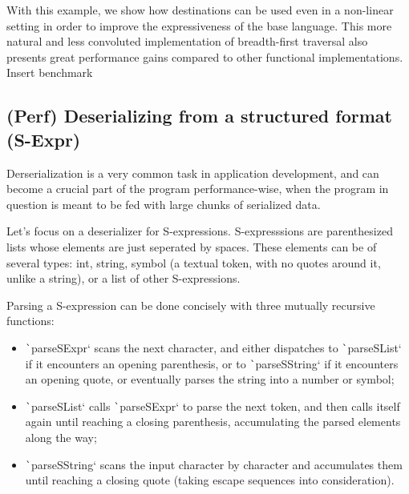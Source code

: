 \documentclass[english]{jflart}
\newcommand{\TODO}[1]{{\color{red}\large #1}}
\begin{document}
With this example, we show how destinations can be used even in a non-linear setting in order to improve the expressiveness of the base language. This more natural and less convoluted implementation of breadth-first traversal also presents great performance gains compared to other functional implementations. \TODO{Insert benchmark}

\subsection{(Perf) Deserializing from a structured format (S-Expr)}

Derserialization is a very common task in application development, and can become a crucial part of the program performance-wise, when the program in question is meant to be fed with large chunks of serialized data.

Let's focus on a deserializer for S-expressions. S-expresssions are parenthesized lists whose elements are just seperated by spaces. These elements can be of several types: int, string, symbol (a textual token, with no quotes around it, unlike a string), or a list of other S-expressions.

Parsing a S-expression can be done concisely with three mutually recursive functions:
\begin{itemize}
  \item \texttt`parseSExpr` scans the next character, and either dispatches to \texttt`parseSList` if it encounters an opening parenthesis, or to \texttt`parseSString` if it encounters an opening quote, or eventually parses the string into a number or symbol;
  \item \texttt`parseSList` calls \texttt`parseSExpr` to parse the next token, and then calls itself again until reaching a closing parenthesis, accumulating the parsed elements along the way;
  \item \texttt`parseSString` scans the input character by character and accumulates them until reaching a closing quote (taking escape sequences into consideration).
\end{itemize}
\end{document}
